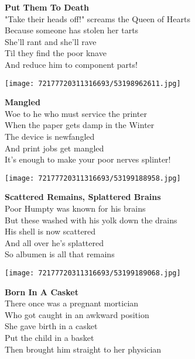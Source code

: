 \documentclass[10pt,letterpaper]{article}
\begin{document}
\begin{center}
\textbf{Put Them To Death}\\
\vskip 0.2in
"Take their heads off!" screams the Queen of Hearts\\
Because someone has stolen her tarts\\
She'll rant and she'll rave\\
Til they find the poor knave\\
And reduce him to component parts!\\
\end{center}
\pagebreak

\begin{center}\texttt{[image: 72177720311316693/53198962611.jpg]}
\end{center}
\begin{center}
\textbf{Mangled}\\
\vskip 0.2in
Woe to he who must service the printer\\
When the paper gets damp in the Winter\\
The device is newfangled\\
And print jobs get mangled\\
It's enough to make your poor nerves splinter!\\
\end{center}
\pagebreak

\begin{center}
\texttt{[image: 72177720311316693/53199188958.jpg]}
\end{center}

\begin{center}
\textbf{Scattered Remains, Splattered Brains}\\
\vskip 0.2in
Poor Humpty was known for his brains\\
But these washed with his yolk down the drains\\
His shell is now scattered\\
And all over he's splattered\\
So albumen is all that remains\\
\end{center}
\pagebreak

\begin{center}\texttt{[image: 72177720311316693/53199189068.jpg]}
\end{center}
\begin{center}
\textbf{Born In A Casket}\\
\vskip 0.2in
There once was a pregnant mortician\\
Who got caught in an awkward position\\
She gave birth in a casket\\
Put the child in a basket\\
Then brought him straight to her physician\\
\end{center}
\pagebreak
\end{document}
